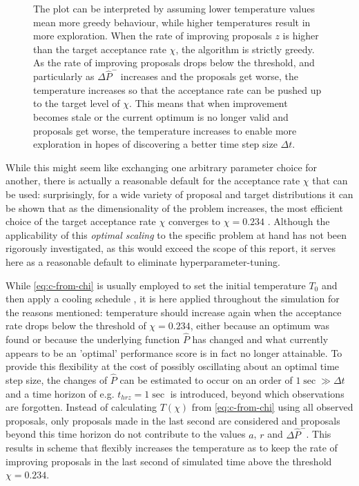 \documentclass[oneside, a4paper]{book}
\newcommand\br[1]{\left(#1\right)}
\begin{document}
\begin{figure}
{      The plot can be interpreted by assuming lower temperature values mean more greedy behaviour, while higher temperatures result in more exploration. When the rate of improving proposals $z$ is higher than the target acceptance rate $\chi$, the algorithm is strictly greedy. As the rate of improving proposals drops below the threshold, and particularly as $\Delta \hat{P}^-$ increases and the proposals get worse, the temperature increases so that the acceptance rate can be pushed up to the target level of $\chi$. This means that when improvement becomes stale or the current optimum is no longer valid and proposals get worse, the temperature increases to enable more exploration in hopes of discovering a better time step size $\Delta t$.}
      \label{fig:temperature}
    \end{figure}

    While this might seem like exchanging one arbitrary parameter choice for another, there is actually a reasonable default for the acceptance rate $\chi$ that can be used: surprisingly, for a wide variety of proposal and target distributions it can be shown that as the dimensionality of the problem increases, the most efficient choice of the target acceptance rate $\chi$ converges to $\chi=0.234$ \autocites{moving-beyond-0234}{exploring-0234-arxiv}. Although the applicability of this \textit{optimal scaling} to the specific problem at hand has not been rigorously investigated, as this would exceed the scope of this report, it serves here as a reasonable default to eliminate hyperparameter-tuning. 
    
    While \autoref{eq:c-from-chi} is usually employed to set the initial temperature $T_0$ and then apply a cooling schedule \autocite{simulated-annealing}, it is here applied throughout the simulation for the reasons mentioned: temperature should increase again when the acceptance rate drops below the threshold of $\chi=0.234$, either because an optimum was found or because the underlying function $\hat{P}$ has changed and what currently appears to be an 'optimal' performance score is in fact no longer attainable. 
    To provide this flexibility at the cost of possibly oscillating about an optimal time step size, the changes of $\hat{P}$ can be estimated to occur on an order of $1\sec \gg \Delta t$ and a time horizon of e.g. $t_{hrz}=1\sec$ is introduced, beyond which observations are forgotten. Instead of calculating $T\br{\chi}$ from \autoref{eq:c-from-chi} using all observed proposals, only proposals made in the last second are considered and proposals beyond this time horizon do not contribute to the values $a$, $r$ and $\Delta \hat{P}^-$. This results in scheme that flexibly increases the temperature as to keep the rate of improving proposals in the last second of simulated time above the threshold $\chi=0.234$. 
\end{document}
